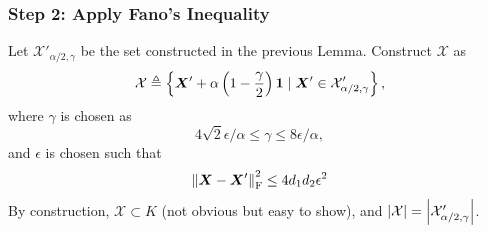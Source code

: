\documentclass[10pt,xcolor={usenames,dvipsnames,table},aspectratio=169]{beamer}
\begin{document}
\begin{frame}
    \frametitle{Step 2: Apply Fano's Inequality}
    Let $\mathcal{X}'_{\alpha/2, \gamma}$ be the set constructed in the previous Lemma. Construct $\mathcal{X}$ as
    \[
    \mathcal{X} \triangleq \left\{\bm{X}' + \alpha \left( 1 - \dfrac{\gamma}{2} \right) \bm{1} \mid \bm{X}' \in \mathcal{X}'_{\alpha/2, \gamma}\right\},
    \] where  $\gamma$ is chosen as 
    \[
    4\sqrt{2}\epsilon/\alpha \leq \gamma \leq 8\epsilon/\alpha,
    \] 
    and $\epsilon$ is chosen such that
    \[
    \left\lVert\bm{X} - \bm{X}'\right\rVert_{\rm F}^2 \leq 4d_1d_2\epsilon^2
    \] 
    By construction, $\mathcal{X} \subset K$ (not obvious but easy to show), and $\left\lvert\mathcal{X}\right\rvert = \left\lvert\mathcal{X}'_{\alpha/2, \gamma}\right\rvert$.


    
\end{frame}
\end{document}
